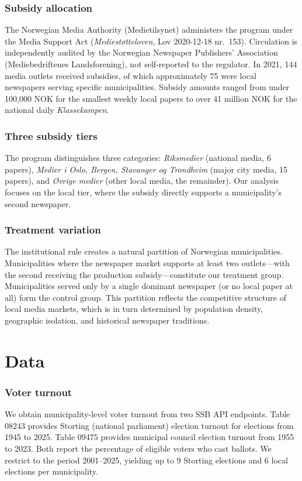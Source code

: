\documentclass[12pt]{article}
\begin{document}
\subsubsection*{Subsidy allocation} The Norwegian Media Authority (Medietilsynet) administers the program under the Media Support Act (\textit{Mediestøtteloven}, Lov 2020-12-18 nr.\ 153). Circulation is independently audited by the Norwegian Newspaper Publishers' Association (Mediebedriftenes Landsforening), not self-reported to the regulator. In 2021, 144 media outlets received subsidies, of which approximately 75 were local newspapers serving specific municipalities. Subsidy amounts ranged from under 100,000 NOK for the smallest weekly local papers to over 41 million NOK for the national daily \textit{Klassekampen}.

\subsubsection*{Three subsidy tiers} The program distinguishes three categories: \textit{Riksmedier} (national media, 6 papers), \textit{Medier i Oslo, Bergen, Stavanger og Trondheim} (major city media, 15 papers), and \textit{Øvrige medier} (other local media, the remainder). Our analysis focuses on the local tier, where the subsidy directly supports a municipality's second newspaper.

\subsubsection*{Treatment variation} The institutional rule creates a natural partition of Norwegian municipalities. Municipalities where the newspaper market supports at least two outlets---with the second receiving the production subsidy---constitute our treatment group. Municipalities served only by a single dominant newspaper (or no local paper at all) form the control group. This partition reflects the competitive structure of local media markets, which is in turn determined by population density, geographic isolation, and historical newspaper traditions.

\section{Data} \label{sec:data}

\subsubsection*{Voter turnout} We obtain municipality-level voter turnout from two SSB API endpoints. Table 08243 provides Storting (national parliament) election turnout for elections from 1945 to 2025. Table 09475 provides municipal council election turnout from 1955 to 2023. Both report the percentage of eligible voters who cast ballots. We restrict to the period 2001--2025, yielding up to 9 Storting elections and 6 local elections per municipality.
\end{document}
